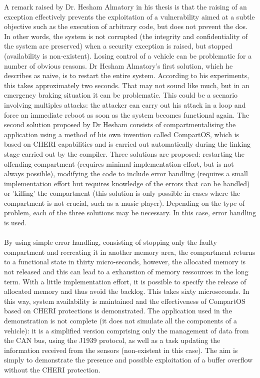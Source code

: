 \documentclass[a4paper, 11pt]{article}
\begin{document}
A remark raised by Dr. Hesham Almatory in his thesis \cite{almatary2022compartos} is that the raising of an exception effectively prevents the exploitation of a vulnerability aimed at a subtle objective such as the execution of arbitrary code, but does not prevent the \Gls{dos}.
In other words, the system is not corrupted (the integrity and confidentiality of the system are preserved) when a security exception is raised, but stopped (availability is non-existent). Losing control of a vehicle can be problematic for a number of obvious reasons. Dr Hesham Almatory's first solution, which he describes as naive, is to restart the entire system. According to his experiments, this takes approximately two seconds. That may not sound like much, but in an emergency braking situation it can be problematic. This could be a scenario involving multiples attacks: the attacker can carry out his attack in a loop and force an immediate reboot as soon as the system becomes functional again. 
The second solution proposed by Dr Hesham consists of compartmentalising the application using a method of his own invention called CompartOS, which is based on CHERI capabilities and is carried out automatically during the linking stage carried out by the compiler. Three solutions are proposed: restarting the offending compartment (requires minimal implementation effort, but is not always possible), modifying the code to include error handling (requires a small implementation effort but requires knowledge of the errors that can be handled) or 'killing' the compartment (this solution is only possible in cases where the compartment is not crucial, such as a music player). Depending on the type of problem, each of the three solutions may be necessary. In this case, error handling is used. \\ \\

By using simple error handling, consisting of stopping only the faulty compartment and recreating it in another memory area, the compartment returns to a functional state in thirty micro-seconds, however, the allocated memory is not released and this can lead to a exhaustion of memory ressources in the long term. With a little implementation effort, it is possible to specify the release of allocated memory and thus avoid the backlog. This takes sixty microseconds. In this way, system availability is maintained and the effectiveness of CompartOS based on CHERI protections is demonstrated.
The application used in the demonstration is not complete (it does not simulate all the components of a vehicle): it is a simplified version comprising only the management of data from the CAN bus, using the J1939 protocol, as well as a task updating the information received from the sensors (non-existent in this case). The aim is simply to demonstrate the presence and possible exploitation of a buffer overflow without the CHERI protection.
\end{document}
